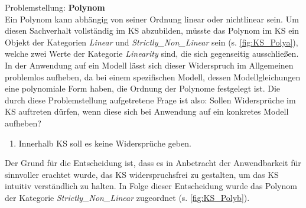 Problemstellung: \textbf{Polynom}\\
Ein Polynom kann abhängig von seiner Ordnung linear oder nichtlinear sein. Um diesen Sachverhalt vollständig im KS abzubilden, müsste das Polynom im KS ein Objekt der Kategorien \textit{Linear} und \textit{Strictly\_Non\_Linear} sein (s. \autoref{fig:KS_Polya}), welche zwei Werte der Kategorie \textit{Linearity} sind, die sich gegenseitig ausschließen. In der Anwendung auf ein Modell lässt sich dieser Widerspruch im Allgemeinen problemlos aufheben, da bei einem spezifischen Modell, dessen Modellgleichungen eine polynomiale Form haben, die Ordnung der Polynome festgelegt ist. Die durch diese Problemstellung aufgetretene Frage ist also: Sollen Widersprüche im KS auftreten dürfen, wenn diese sich bei Anwendung auf ein konkretes Modell aufheben?
\begin{enumerate}[resume*]
	\item \label{E.KS_Widersprüche}Innerhalb KS soll es keine Widersprüche geben.
\end{enumerate}
Der Grund für die Entscheidung ist, dass es in Anbetracht der Anwendbarkeit für sinnvoller erachtet wurde, das KS widerspruchsfrei zu gestalten, um das KS intuitiv verständlich zu halten. In Folge dieser Entscheidung wurde das Polynom der Kategorie \textit{Strictly\_Non\_Linear} zugeordnet (s. \autoref{fig:KS_Polyb}).

